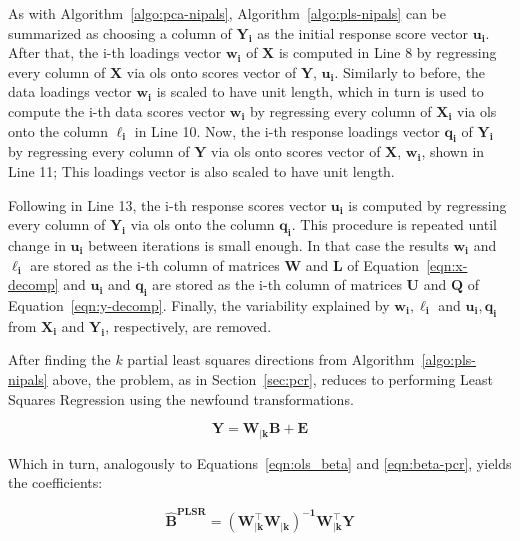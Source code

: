 As with Algorithm~\ref{algo:pca-nipals}, Algorithm~\ref{algo:pls-nipals} can be summarized as choosing a column of $\mathbf{Y_i}$ as the initial response score vector $\mathbf{u_i}$. After that, the i-th loadings vector $\mathbf{w_i}$  of $\mathbf{X}$ is computed in Line 8 by regressing every column of $\mathbf{X}$ via \acrshort{ols} onto scores vector of $\mathbf{Y}$, $\mathbf{u_i}$. Similarly to before, the data loadings vector $\mathbf{w_i}$ is scaled to have unit length, which in turn is used to compute the i-th data scores vector $\mathbf{w_i}$ by regressing every column of $\mathbf{X_i}$ via \acrshort{ols} onto the column $\mathbf{\ell_i}$ in Line 10. Now, the i-th response loadings vector $\mathbf{q_i}$  of $\mathbf{Y_i}$  by regressing every column of $\mathbf{Y}$ via \acrshort{ols} onto scores vector of $\mathbf{X}$, $\mathbf{w_i}$, shown in Line 11; This loadings vector is also scaled to have unit length. 

Following in Line 13, the i-th response scores vector $\mathbf{u_i}$ is computed by regressing every column of $\mathbf{Y_i}$ via \acrshort{ols} onto the column $\mathbf{q_i}$. This procedure is repeated until change in $\mathbf{u_i}$ between iterations is small enough. In that case the results $\mathbf{w_i}$ and $\mathbf{\ell_i}$ are stored as the i-th column of matrices $\mathbf{W}$ and $\mathbf{L}$ of Equation~\ref{eqn:x-decomp} and $\mathbf{u_i}$ and $\mathbf{q_i}$ are stored as the i-th column of matrices $\mathbf{U}$ and $\mathbf{Q}$ of Equation~\ref{eqn:y-decomp}. Finally, the variability explained by $\mathbf{w_i, \ell_i}$ and $\mathbf{u_i, q_i}$ from $\mathbf{X_i}$ and $\mathbf{Y_i}$, respectively, are removed.

After finding the $k$ partial least squares directions from Algorithm~\ref{algo:pls-nipals} above, the problem, as in Section~\ref{sec:pcr}, reduces to performing Least Squares Regression using the newfound transformations.

	\begin{equation}
	\label{eqn:plsr}
	\mathbf{Y = W_{|k} B + E}
\end{equation}

Which in turn, analogously to Equations~\ref{eqn:ols_beta} and \ref{eqn:beta-pcr}, yields the coefficients:

\begin{equation}
	\label{eqn:beta-plsr}
	\mathbf{\hat{B}^{\text{PLSR}} = (W_{|k}^\intercal W_{|k})^{-1}W_{|k}^\intercal Y}
\end{equation}

